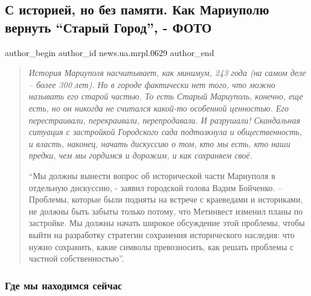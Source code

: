  
 
 
 
 
 
\subsection{С историей, но без памяти. Как Мариуполю вернуть \enquote{Старый Город}, - ФОТО}
\label{sec:24_04_2021.stz.news.ua.mrpl.0629.1.s_istoriej_no_bez_pamjati}
 
\ifcmt
 author_begin
   author_id news.ua.mrpl.0629
 author_end
\fi


\begin{quote}
\em
История Мариуполя насчитывает, как минимум, 243 года (на самом деле – более 300
лет). Но в городе фактически нет того, что можно называть его старой частью. То
есть Старый Мариуполь, конечно, еще есть, но он никогда не считался какой-то
особенной ценностью. Его перестраивали, перекраивали, перепродавали. И
разрушали!  Скандальная ситуация с застройкой Городского сада подтолкнула и
общественность, и власть, наконец, начать дискуссию о том, кто мы есть, кто
наши предки, чем мы гордимся и дорожим, и как сохраняем своё. 

\enquote{Мы должны вынести вопрос об исторической части Мариуполя в отдельную
дискуссию, - заявил городской голова Вадим Бойченко. – Проблемы, которые были
подняты на встрече с краеведами и историками, не должны быть забыты только
потому, что Метинвест изменил планы по застройке. Мы должны начать широкое
обсуждение этой проблемы, чтобы выйти на разработку стратегии сохранения
исторического наследия: что нужно сохранить, какие символы превозносить, как
решать проблемы с частной собственностью}.
\end{quote}

\subsubsection{Где мы находимся сейчас}

